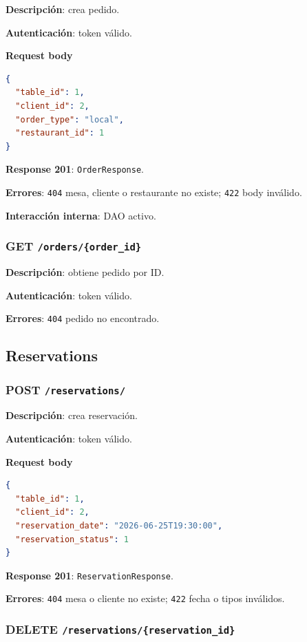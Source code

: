 \documentclass[12pt,letterpaper]{article}
\def\codefile#1{\nolinkurl{#1}}
\def\methodget{\textbf{\color{blue!60!black}GET}}
\def\methodpost{\textbf{\color{green!45!black}POST}}
\def\methoddelete{\textbf{\color{red!70!black}DELETE}}
\begin{document}
\textbf{Descripción}: crea pedido.

\textbf{Autenticación}: token válido.

\textbf{Request body}
\begin{lstlisting}[language=json]
{
  "table_id": 1,
  "client_id": 2,
  "order_type": "local",
  "restaurant_id": 1
}
\end{lstlisting}

\textbf{Response 201}: \codefile{OrderResponse}.

\textbf{Errores}: \codefile{404} mesa, cliente o restaurante no existe; \codefile{422} body inválido.

\textbf{Interacción interna}: DAO activo.

\subsubsection{\methodget{} \codefile{/orders/\{order\_id\}}}

\textbf{Descripción}: obtiene pedido por ID.

\textbf{Autenticación}: token válido.

\textbf{Errores}: \codefile{404} pedido no encontrado.

\subsection{Reservations}

\subsubsection{\methodpost{} \codefile{/reservations/}}

\textbf{Descripción}: crea reservación.

\textbf{Autenticación}: token válido.

\textbf{Request body}
\begin{lstlisting}[language=json]
{
  "table_id": 1,
  "client_id": 2,
  "reservation_date": "2026-06-25T19:30:00",
  "reservation_status": 1
}
\end{lstlisting}

\textbf{Response 201}: \codefile{ReservationResponse}.

\textbf{Errores}: \codefile{404} mesa o cliente no existe; \codefile{422} fecha o tipos inválidos.

\subsubsection{\methoddelete{} \codefile{/reservations/{reservation_id}}}
\end{document}
